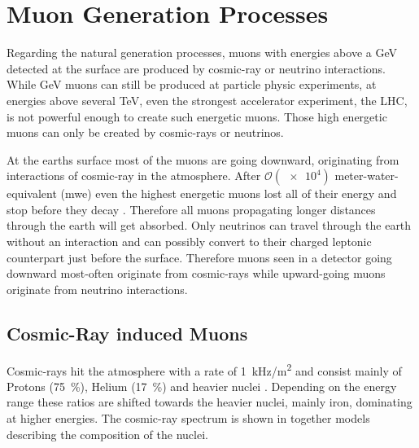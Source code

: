 \chapter{Muon Generation Processes} \label{sec:generation}

Regarding the natural generation processes, muons with energies above a GeV detected at the surface are produced by cosmic-ray or neutrino interactions.
While GeV muons can still be produced at particle physic experiments, at energies above several TeV, even the strongest accelerator experiment, the LHC, is not powerful enough to create such energetic muons.
Those high energetic muons can only be created by cosmic-rays or neutrinos.

At the earths surface most of the muons are going downward, originating from interactions of cosmic-ray in the atmosphere.
After $\mathcal{O}(\num{e4})$ meter-water-equivalent (mwe) even the highest energetic muons lost all of their energy and stop before they decay \cite{PDG20}.
Therefore all muons propagating longer distances through the earth will get absorbed.
Only neutrinos can travel through the earth without an interaction and can possibly convert to their charged leptonic counterpart just before the surface.
Therefore muons seen in a detector going downward most-often originate from cosmic-rays while upward-going muons originate from neutrino interactions.

\section{Cosmic-Ray induced Muons}

Cosmic-rays hit the atmosphere with a rate of \SI{1}{kHz/m^2} and consist mainly of Protons (\SI{75}{\percent}), Helium (\SI{17}{\percent}) and heavier nuclei \cite{Gaisser16CR}.
Depending on the energy range these ratios are shifted towards the heavier nuclei, mainly iron, dominating at higher energies.
The cosmic-ray spectrum is shown in  together models describing the composition of the nuclei.

